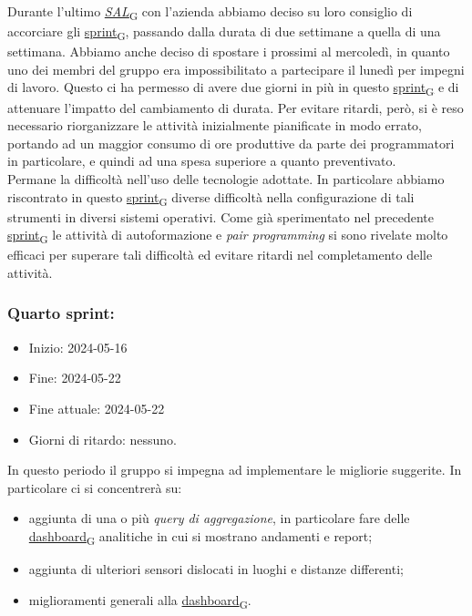 Durante l'ultimo \href{https://7last.github.io/docs/rtb/documentazione-interna/glossario\#stato-avanzamento-lavori}{\textit{SAL}\textsubscript{G}} con l'azienda abbiamo deciso su loro consiglio di accorciare gli \href{https://7last.github.io/docs/rtb/documentazione-interna/glossario\#sprint}{sprint\textsubscript{G}}, passando dalla durata di due settimane a quella di una settimana. Abbiamo anche deciso di spostare i prossimi al mercoledì, in quanto uno dei membri del gruppo era impossibilitato a partecipare il lunedì per impegni di lavoro. Questo ci ha permesso di avere due giorni in più in questo \href{https://7last.github.io/docs/rtb/documentazione-interna/glossario\#sprint}{sprint\textsubscript{G}} e di attenuare l'impatto del cambiamento di durata. Per evitare ritardi, però, si è reso necessario riorganizzare le attività inizialmente pianificate in modo errato, portando ad un maggior consumo di ore produttive da parte dei programmatori in particolare, e quindi ad una spesa superiore a quanto preventivato. \\
Permane la difficoltà nell'uso delle tecnologie adottate. In particolare abbiamo riscontrato in questo \href{https://7last.github.io/docs/rtb/documentazione-interna/glossario\#sprint}{sprint\textsubscript{G}} diverse difficoltà nella configurazione di tali strumenti in diversi sistemi operativi. Come già sperimentato nel precedente \href{https://7last.github.io/docs/rtb/documentazione-interna/glossario\#sprint}{sprint\textsubscript{G}} le attività di autoformazione e \textit{pair programming} si sono rivelate molto efficaci per superare tali difficoltà ed evitare ritardi nel completamento delle attività.


\newpage
\subsubsection{Quarto sprint:}
\begin{itemize}
	\item Inizio: 2024-05-16
	\item Fine: 2024-05-22
	\item Fine attuale: 2024-05-22
	\item Giorni di ritardo: nessuno.
\end{itemize}

In questo periodo il gruppo si impegna ad implementare le migliorie suggerite.
In particolare ci si concentrerà su:
\begin{itemize}
	\item aggiunta di una o più \textit{query di aggregazione}, in particolare fare delle \href{https://7last.github.io/docs/rtb/documentazione-interna/glossario\#dashboard}{dashboard\textsubscript{G}} analitiche in cui si
	      mostrano andamenti e report;
	\item aggiunta di ulteriori sensori dislocati in luoghi e distanze differenti;
	\item miglioramenti generali alla \href{https://7last.github.io/docs/rtb/documentazione-interna/glossario\#dashboard}{dashboard\textsubscript{G}}.
\end{itemize}

